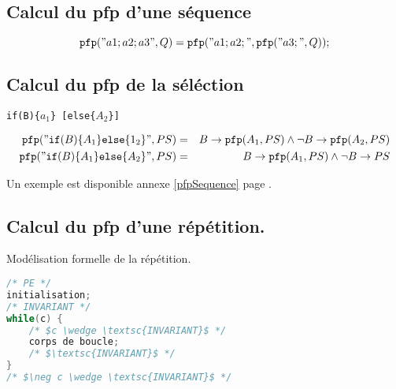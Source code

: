 	\subsection{Calcul du pfp d'une séquence}
	$$\texttt{pfp}("a1;a2;a3", Q) = \texttt{pfp}("a1;a2;", \texttt{pfp}("a3;", Q));$$
	\subsection{Calcul du pfp de la séléction} \begin{center} \texttt{if(B)\{$a_1$\} [else\{$A_2$\}]}
	 \end{center}
\begin{eqnarray*}
	\texttt{pfp}("\texttt{if}(B)\{A_1\}\texttt{else}\{1_2\}", PS) &=&
	B \rightarrow \texttt{pfp}(A_1, PS) \wedge \neg B \rightarrow \texttt{pfp} (A_2, PS)\\
	\texttt{pfp}("\texttt{if}(B)\{A_1\}\texttt{else}\{A_2\}", PS) &=& B \rightarrow \texttt{pfp}(A_1, PS) \wedge \neg B \rightarrow PS 
\end{eqnarray*}

Un exemple est disponible annexe \ref{pfpSequence} page \pageref{pfpSequence}.

\subsection{Calcul du pfp d'une répétition.}\label{pfpBoucle}
Modélisation formelle de la répétition.
\begin{lstlisting}[language=C]
/* PE */
initialisation;
/* INVARIANT */
while(c) {
	/* $c \wedge \textsc{INVARIANT}$ */
	corps de boucle;
	/* $\textsc{INVARIANT}$ */
}
/* $\neg c \wedge \textsc{INVARIANT}$ */
\end{lstlisting}

